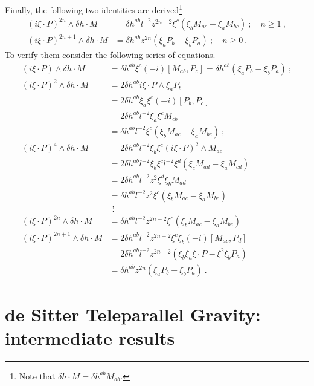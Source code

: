 \documentclass[11pt]{article}
\begin{document}
Finally, the following two identities are derived\footnote{Note 
	that $\delta h \cdot M = \delta h^{ab} M_{ab}$.}
%
\begin{align}
	\label{eq:id_dS_comm.3}
	(i\xi\cdot P)^{2n} \wedge \delta h \cdot M &= \delta h^{ab} 
	l^{-2}z^{2n-2} \xi^c(\xi_b M_{ac} - \xi_a M_{bc})~;\quad n 
	\geqslant 1~, \\
	\label{eq:id_dS_comm.4}
	(i\xi\cdot P)^{2n+1} \wedge \delta h \cdot M &= \delta h^{ab} 
	z^{2n} (\xi_a P_b - \xi_b P_a)~;\quad n \geqslant 0~.
\end{align}
To verify them consider the following series of equations.
%
\begin{align*}
	(i\xi\cdot P)\wedge \delta h \cdot M
	&= \delta h^{ab} \xi^c (-i)[M_{ab},P_c] = \delta h^{ab} (\xi_a 
	P_b - \xi_b P_a)~; \\
	(i\xi\cdot P)^2\wedge \delta h \cdot M
	&= 2 \delta h^{ab} i\xi\cdot P \wedge \xi_a P_b \\
	&= 2 \delta h^{ab} \xi_a \xi^c (-i) [P_b,P_c] \\
	&= 2 \delta h^{ab} l^{-2} \xi_a \xi^c M_{cb} \\
	&= \delta h^{ab} l^{-2} \xi^c (\xi_b M_{ac} - \xi_a M_{bc})~; 
	\\
	(i\xi\cdot P)^4 \wedge \delta h \cdot M
	&= 2\delta h^{ab} l^{-2} \xi_b \xi^c (i\xi\cdot P)^2 \wedge 
	M_{ac} \\
	&= 2\delta h^{ab} l^{-2} \xi_b \xi^c l^{-2} \xi^d (\xi_c 
	M_{ad} - \xi_a M_{cd}) \\
	&= 2 \delta h^{ab} l^{-2} z^2 \xi^d \xi_b M_{ad} \\
	&= \delta h^{ab} l^{-2} z^2 \xi^c (\xi_b M_{ac} - \xi_a 
	M_{bc}) \\
	&~\,\vdots
	\\
	(i\xi\cdot P)^{2n} \wedge \delta h \cdot M
	&= \delta h^{ab} l^{-2} z^{2n-2} \xi^c (\xi_b M_{ac} - \xi_a 
	M_{bc}) \\
	(i\xi\cdot P)^{2n+1} \wedge \delta h \cdot M
	&= 2\delta h^{ab} l^{-2} z^{2n-2} \xi^c \xi_b (-i) 
	[M_{ac},P_d] \\
	&= 2\delta h^{ab} l^{-2} z^{2n-2} (\xi_b\xi_a \xi\cdot P - 
	\xi^2 \xi_b P_a) \\
	&= \delta h^{ab} z^{2n} (\xi_a P_b - \xi_b P_a)~.
\end{align*}


\section{de Sitter Teleparallel Gravity: intermediate results}
\end{document}
